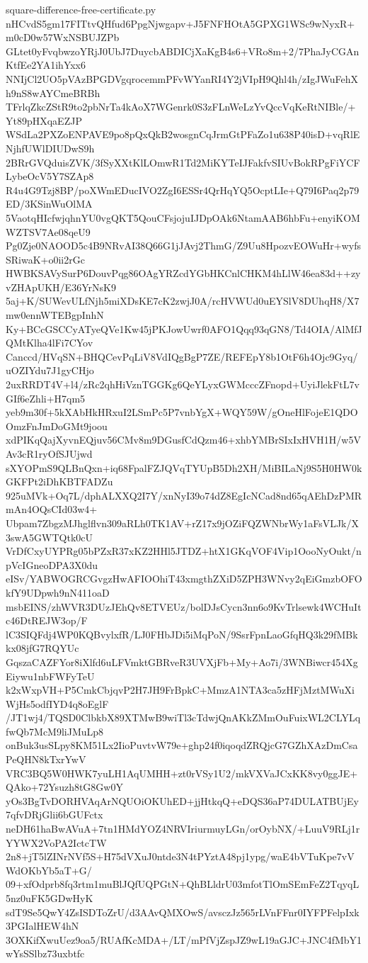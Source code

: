 \documentclass[11pt]{article}
\theoremstyle{definition}
\theoremstyle{remark}
\begin{document}
\begin{filecontents*}[overwrite]{square-difference-free-certificate.py}
nHCvdS5gm17FITtvQHfud6PpgNjwgapv+J5FNFHOtA5GPXG1WSc9wNyxR+m0cD0w57WxNSBUJZPb
GLtet0yFvqbwzoYRjJ0UbJ7DuycbABDICjXaKgB4s6+VRo8m+2/7PhaJyCGAnKtfEe2YA1ihYxx6
NNIjCl2UO5pVAzBPGDVgqrocemmPFvWYanRI4Y2jVIpH9Qhl4h/zIgJWuFehXh9nS8wAYCmeBRBh
TFrlqZkcZStR9to2pbNrTa4kAoX7WGenrk0S3zFLnWeLzYvQccVqKeRtNIBle/+Yt89pHXqaEZJP
WSdLa2PXZoENPAVE9po8pQxQkB2wosgnCqJrmGtPFaZo1u638P40isD+vqRlENjhfUWlDIUDwS9h
2BRrGVQduisZVK/3fSyXXtKlLOmwR1Td2MiKYTeIJFakfvSIUvBokRPgFiYCFLybeOcV5Y7SZAp8
R4u4G9Tzj8BP/poXWmEDucIVO2ZgI6ESSr4QrHqYQ5OcptLIe+Q79I6Paq2p79ED/3KSinWuOlMA
5VaotqHIcfwjqhnYU0vgQKT5QouCFsjojuIJDpOAk6NtamAAB6hbFu+enyiKOMWZTSV7Ae08qeU9
Pg0Zje0NAOOD5c4B9NRvAI38Q66G1jJAvj2ThmG/Z9Uu8HpozvEOWuHr+wyfsSRiwaK+o0ii2rGc
HWBKSAVySurP6DouvPqg86OAgYRZcdYGbHKCnlCHKM4hLlW46ea83d++zyvZHApUKH/E36YrNsK9
5aj+K/SUWevULfNjh5miXDsKE7cK2zwjJ0A/rcHVWUd0uEYSlV8DUhqH8/X7mw0ennWTEBgpInhN
Ky+BCcGSCCyATyeQVe1Kw45jPKJowUwrf0AFO1Qqq93qGN8/Td4OIA/AlMfJQMtKlha4lFi7CYov
Canccd/HVqSN+BHQCevPqLiV8VdIQgBgP7ZE/REFEpY8b1OtF6h4Ojc9Gyq/uOZIYdu7J1gyCHjo
2uxRRDT4V+l4/zRc2qhHiVznTGGKg6QeYLyxGWMcccZFnopd+UyiJlekFtL7vGIf6eZhli+H7qm5
yeb9m30f+5kXAbHkHRxuI2LSmPc5P7vnbYgX+WQY59W/gOneHlFojeE1QDOOmzFnJmDoGMt9joou
xdPIKqQajXyvnEQjuv56CMv8m9DGusfCdQzm46+xhbYMBrSIxIxHVH1H/w5VAv3cR1ryOfSJUjwd
sXYOPmS9QLBnQxn+iq68FpalFZJQVqTYUpB5Dh2XH/MiBILaNj9S5H0HW0kGKFPt2iDhKBTFADZu
925uMVk+Oq7L/dphALXXQ2I7Y/xnNyI39o74dZ8EgIcNCad8nd65qAEhDzPMRmAn4OQsCId03w4+
Ubpam7ZbgzMJhglflvn309aRLh0TK1AV+rZ17x9jOZiFQZWNbrWy1aFsVLJk/X3swA5GWTQtk0cU
VrDfCxyUYPRg05bPZxR37xKZ2HHl5JTDZ+htX1GKqVOF4Vip1OooNyOukt/npVcIGneoDPA3X0du
eISv/YABWOGRCGvgzHwAFIOOhiT43xmgthZXiD5ZPH3WNvy2qEiGmzbOFOkfY9UDpwh9nN411oaD
msbEINS/zhWVR3DUzJEhQv8ETVEUz/bolDJsCycn3nn6o9KvTrlsewk4WCHuItc46DtREJW3op/F
lC3SIQFdj4WP0KQBvylxfR/LJ0FHbJDi5iMqPoN/9SsrFpnLaoGfqHQ3k29fMBkkx08jfG7RQYUc
GqszaCAZFYor8iXlfd6uLFVmktGBRveR3UVXjFb+My+Ao7i/3WNBiwcr454XgEiywu1nbFWFyTeU
k2xWxpVH+P5CmkCbjqvP2H7JH9FrBpkC+MmzA1NTA3ca5zHFjMztMWuXiWjHs5odfIYD4q8oEglF
/JT1wj4/TQSD0ClbkbX89XTMwB9wiTl3cTdwjQnAKkZMmOuFuixWL2CLYLqfwQb7McM9liJMuLp8
onBuk3usSLpy8KM51Lx2IioPuvtvW79e+ghp24f0iqoqdZRQjcG7GZhXAzDmCsaPeQHN8kTxrYwV
VRC3BQ5W0HWK7yuLH1AqUMHH+zt0rVSy1U2/mkVXVaJCxKK8vy0ggJE+QAko+72Ysuzh8tG8Gw0Y
yOs3BgTvDORHVAqArNQUOiOKUhED+jjHtkqQ+eDQS36aP74DULATBUjEy7qfvDRjGlii6bGUFctx
neDH61haBwAVuA+7tn1HMdYOZ4NRVIriurmuyLGn/orOybNX/+LuuV9RLj1rYYWX2VoPA2IctcTW
2n8+jT5lZINrNVf5S+H75dVXuJ0ntde3N4tPYztA48pj1ypg/waE4bVTuKpe7vVWdOKbYb5aT+G/
09+xfOdprb8fq3rtm1muBlJQfUQPGtN+QhBLldrU03mfotTlOmSEmFeZ2TqyqL5nz0uFK5GDwHyK
sdT9Se5QwY4ZsISDToZrU/d3AAvQMXOwS/avsczJz565rLVnFFnr0IYFPFelpIxk3PGIalHEW4hN
3OXKifXwuUez9oa5/RUAfKcMDA+/LT/mPfVjZspJZ9wL19aGJC+JNC4fMbY1wYsSSlbz73uxbtfc

\end{filecontents*}
\end{document}
